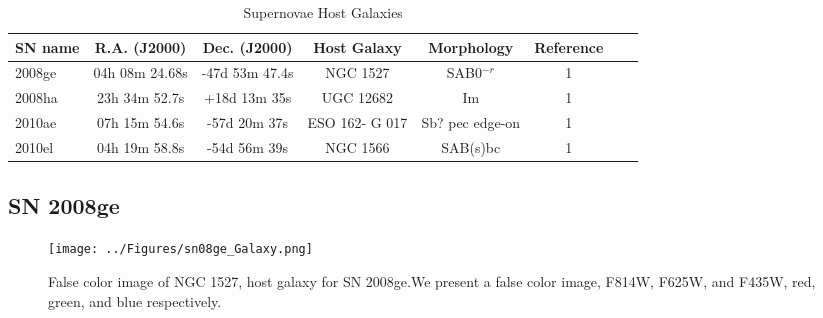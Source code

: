 \documentclass[preprint]{aastex}
\begin{document}
\begin{table}[ht]
\begin{center}
\caption{Supernovae Host Galaxies} 
\begin{tabular}{l*{6}{c}r}
\hline\hline
SN name & R.A. (J2000) & Dec. (J2000) & Host Galaxy  & Morphology & Reference  \\%
\hline
2008ge   & 04h 08m 24.68s & -47d 53m 47.4s    & NGC 1527           & SAB0$^{-r}$     & 1 \\%
2008ha   & 23h 34m 52.7s   & +18d 13m 35s     & UGC 12682         &  Im                    & 1 \\%
2010ae   & 07h 15m 54.6s   & -57d 20m 37s      & ESO 162- G 017  & Sb? pec edge-on & 1 \\%
2010el    & 04h 19m 58.8s   & -54d 56m 39s      & NGC 1566           & SAB(s)bc           & 1 \\%
\hline
\end{tabular}
\label{tab:multicol}
\end{center}
\end{table}

\subsection{SN 2008ge}

\begin{figure}[htp]
    \centering
    \texttt{[image: ../Figures/sn08ge\_Galaxy.png]}
    \caption{False color image of NGC 1527, host galaxy for SN 2008ge.We present a false color image, F814W, F625W, and F435W, red, green, and blue respectively.}%
    \label{08gegal}
\end{figure}
\end{document}
